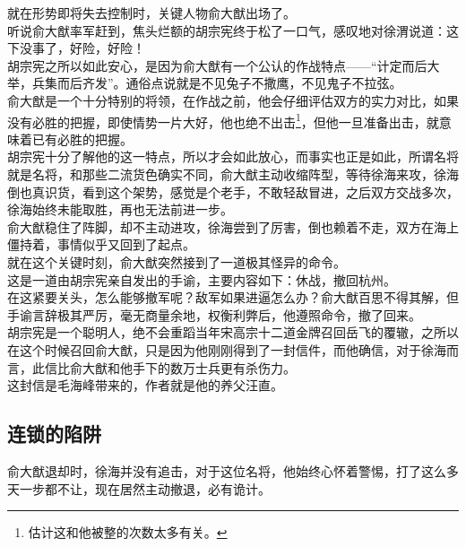 \begin{multicols}{\theparacolNo}
就在形势即将失去控制时，关键人物俞大猷出场了。\\

听说俞大猷率军赶到，焦头烂额的胡宗宪终于松了一口气，感叹地对徐渭说道：这下没事了，好险，好险！\\

胡宗宪之所以如此安心，是因为俞大猷有一个公认的作战特点——“计定而后大举，兵集而后齐发”。通俗点说就是不见兔子不撒鹰，不见鬼子不拉弦。\\

俞大猷是一个十分特别的将领，在作战之前，他会仔细评估双方的实力对比，如果没有必胜的把握，即使情势一片大好，他也绝不出击\footnote{估计这和他被整的次数太多有关。}，但他一旦准备出击，就意味着已有必胜的把握。\\

胡宗宪十分了解他的这一特点，所以才会如此放心，而事实也正是如此，所谓名将就是名将，和那些二流货色确实不同，俞大猷主动收缩阵型，等待徐海来攻，徐海倒也真识货，看到这个架势，感觉是个老手，不敢轻敌冒进，之后双方交战多次，徐海始终未能取胜，再也无法前进一步。\\

俞大猷稳住了阵脚，却不主动进攻，徐海尝到了厉害，倒也赖着不走，双方在海上僵持着，事情似乎又回到了起点。\\

就在这个关键时刻，俞大猷突然接到了一道极其怪异的命令。\\

这是一道由胡宗宪亲自发出的手谕，主要内容如下：休战，撤回杭州。\\

在这紧要关头，怎么能够撤军呢？敌军如果进逼怎么办？俞大猷百思不得其解，但手谕言辞极其严厉，毫无商量余地，权衡利弊后，他遵照命令，撤了回来。\\

胡宗宪是一个聪明人，绝不会重蹈当年宋高宗十二道金牌召回岳飞的覆辙，之所以在这个时候召回俞大猷，只是因为他刚刚得到了一封信件，而他确信，对于徐海而言，此信比俞大猷和他手下的数万士兵更有杀伤力。\\

这封信是毛海峰带来的，作者就是他的养父汪直。\\

\subsection{连锁的陷阱}
俞大猷退却时，徐海并没有追击，对于这位名将，他始终心怀着警惕，打了这么多天一步都不让，现在居然主动撤退，必有诡计。\\


\end{multicols}
